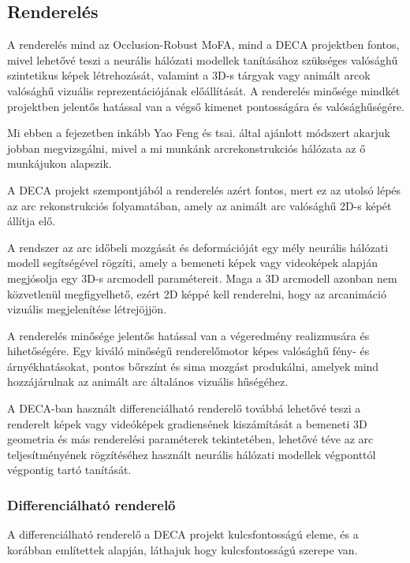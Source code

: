 \documentclass[12pt,a4]{article}
\begin{document}
        \subsection{Renderelés}

            A renderelés mind az \cite{focus}Occlusion-Robust MoFA, mind a \cite{deca}DECA projektben fontos, mivel lehetővé teszi a neurális hálózati modellek tanításához szükséges valósághű szintetikus képek létrehozását, valamint a 3D-s tárgyak vagy animált arcok valósághű vizuális reprezentációjának előállítását. A renderelés minősége mindkét projektben jelentős hatással van a végső kimenet pontosságára és valósághűségére.

            Mi ebben a fejezetben inkább \cite{deca}Yao Feng és tsai. által ajánlott módszert akarjuk jobban megvizsgálni, mivel a mi munkánk arcrekonstrukciós hálózata az ő munkájukon alapszik.

            A DECA projekt szempontjából a renderelés azért fontos, mert ez az utolsó lépés az arc rekonstrukciós folyamatában, amely az animált arc valósághű 2D-s képét állítja elő.

            A rendszer az arc időbeli mozgását és deformációját egy mély neurális hálózati modell segítségével rögzíti, amely a bemeneti képek vagy videoképek alapján megjósolja egy 3D-s arcmodell paramétereit. Maga a 3D arcmodell azonban nem közvetlenül megfigyelhető, ezért 2D képpé kell renderelni, hogy az arcanimáció vizuális megjelenítése létrejöjjön.
            
            A renderelés minősége jelentős hatással van a végeredmény realizmusára és hihetőségére. Egy kiváló minőségű renderelőmotor képes valósághű fény- és árnyékhatásokat, pontos bőrszínt és sima mozgást produkálni, amelyek mind hozzájárulnak az animált arc általános vizuális hűségéhez.
            
            A DECA-ban használt differenciálható renderelő továbbá lehetővé teszi a renderelt képek vagy videóképek gradiensének kiszámítását a bemeneti 3D geometria és más renderelési paraméterek tekintetében, lehetővé téve az arc teljesítményének rögzítéséhez használt neurális hálózati modellek végponttól végpontig tartó tanítását.

            \subsubsection{Differenciálható renderelő}

                A differenciálható renderelő a DECA projekt kulcsfontosságú eleme, és a korábban említettek alapján, láthajuk hogy kulcsfontosságú szerepe van.
\end{document}
